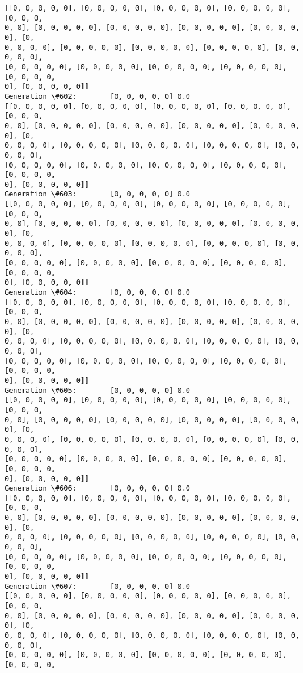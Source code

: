 \documentclass[11pt]{article}
\begin{document}
\begin{Verbatim}[commandchars=\\\{\}]
[[0, 0, 0, 0, 0], [0, 0, 0, 0, 0], [0, 0, 0, 0, 0], [0, 0, 0, 0, 0], [0, 0, 0,
0, 0], [0, 0, 0, 0, 0], [0, 0, 0, 0, 0], [0, 0, 0, 0, 0], [0, 0, 0, 0, 0], [0,
0, 0, 0, 0], [0, 0, 0, 0, 0], [0, 0, 0, 0, 0], [0, 0, 0, 0, 0], [0, 0, 0, 0, 0],
[0, 0, 0, 0, 0], [0, 0, 0, 0, 0], [0, 0, 0, 0, 0], [0, 0, 0, 0, 0], [0, 0, 0, 0,
0], [0, 0, 0, 0, 0]]
Generation \#602:        [0, 0, 0, 0, 0] 0.0
[[0, 0, 0, 0, 0], [0, 0, 0, 0, 0], [0, 0, 0, 0, 0], [0, 0, 0, 0, 0], [0, 0, 0,
0, 0], [0, 0, 0, 0, 0], [0, 0, 0, 0, 0], [0, 0, 0, 0, 0], [0, 0, 0, 0, 0], [0,
0, 0, 0, 0], [0, 0, 0, 0, 0], [0, 0, 0, 0, 0], [0, 0, 0, 0, 0], [0, 0, 0, 0, 0],
[0, 0, 0, 0, 0], [0, 0, 0, 0, 0], [0, 0, 0, 0, 0], [0, 0, 0, 0, 0], [0, 0, 0, 0,
0], [0, 0, 0, 0, 0]]
Generation \#603:        [0, 0, 0, 0, 0] 0.0
[[0, 0, 0, 0, 0], [0, 0, 0, 0, 0], [0, 0, 0, 0, 0], [0, 0, 0, 0, 0], [0, 0, 0,
0, 0], [0, 0, 0, 0, 0], [0, 0, 0, 0, 0], [0, 0, 0, 0, 0], [0, 0, 0, 0, 0], [0,
0, 0, 0, 0], [0, 0, 0, 0, 0], [0, 0, 0, 0, 0], [0, 0, 0, 0, 0], [0, 0, 0, 0, 0],
[0, 0, 0, 0, 0], [0, 0, 0, 0, 0], [0, 0, 0, 0, 0], [0, 0, 0, 0, 0], [0, 0, 0, 0,
0], [0, 0, 0, 0, 0]]
Generation \#604:        [0, 0, 0, 0, 0] 0.0
[[0, 0, 0, 0, 0], [0, 0, 0, 0, 0], [0, 0, 0, 0, 0], [0, 0, 0, 0, 0], [0, 0, 0,
0, 0], [0, 0, 0, 0, 0], [0, 0, 0, 0, 0], [0, 0, 0, 0, 0], [0, 0, 0, 0, 0], [0,
0, 0, 0, 0], [0, 0, 0, 0, 0], [0, 0, 0, 0, 0], [0, 0, 0, 0, 0], [0, 0, 0, 0, 0],
[0, 0, 0, 0, 0], [0, 0, 0, 0, 0], [0, 0, 0, 0, 0], [0, 0, 0, 0, 0], [0, 0, 0, 0,
0], [0, 0, 0, 0, 0]]
Generation \#605:        [0, 0, 0, 0, 0] 0.0
[[0, 0, 0, 0, 0], [0, 0, 0, 0, 0], [0, 0, 0, 0, 0], [0, 0, 0, 0, 0], [0, 0, 0,
0, 0], [0, 0, 0, 0, 0], [0, 0, 0, 0, 0], [0, 0, 0, 0, 0], [0, 0, 0, 0, 0], [0,
0, 0, 0, 0], [0, 0, 0, 0, 0], [0, 0, 0, 0, 0], [0, 0, 0, 0, 0], [0, 0, 0, 0, 0],
[0, 0, 0, 0, 0], [0, 0, 0, 0, 0], [0, 0, 0, 0, 0], [0, 0, 0, 0, 0], [0, 0, 0, 0,
0], [0, 0, 0, 0, 0]]
Generation \#606:        [0, 0, 0, 0, 0] 0.0
[[0, 0, 0, 0, 0], [0, 0, 0, 0, 0], [0, 0, 0, 0, 0], [0, 0, 0, 0, 0], [0, 0, 0,
0, 0], [0, 0, 0, 0, 0], [0, 0, 0, 0, 0], [0, 0, 0, 0, 0], [0, 0, 0, 0, 0], [0,
0, 0, 0, 0], [0, 0, 0, 0, 0], [0, 0, 0, 0, 0], [0, 0, 0, 0, 0], [0, 0, 0, 0, 0],
[0, 0, 0, 0, 0], [0, 0, 0, 0, 0], [0, 0, 0, 0, 0], [0, 0, 0, 0, 0], [0, 0, 0, 0,
0], [0, 0, 0, 0, 0]]
Generation \#607:        [0, 0, 0, 0, 0] 0.0
[[0, 0, 0, 0, 0], [0, 0, 0, 0, 0], [0, 0, 0, 0, 0], [0, 0, 0, 0, 0], [0, 0, 0,
0, 0], [0, 0, 0, 0, 0], [0, 0, 0, 0, 0], [0, 0, 0, 0, 0], [0, 0, 0, 0, 0], [0,
0, 0, 0, 0], [0, 0, 0, 0, 0], [0, 0, 0, 0, 0], [0, 0, 0, 0, 0], [0, 0, 0, 0, 0],
[0, 0, 0, 0, 0], [0, 0, 0, 0, 0], [0, 0, 0, 0, 0], [0, 0, 0, 0, 0], [0, 0, 0, 0,

\end{Verbatim}
\end{document}
